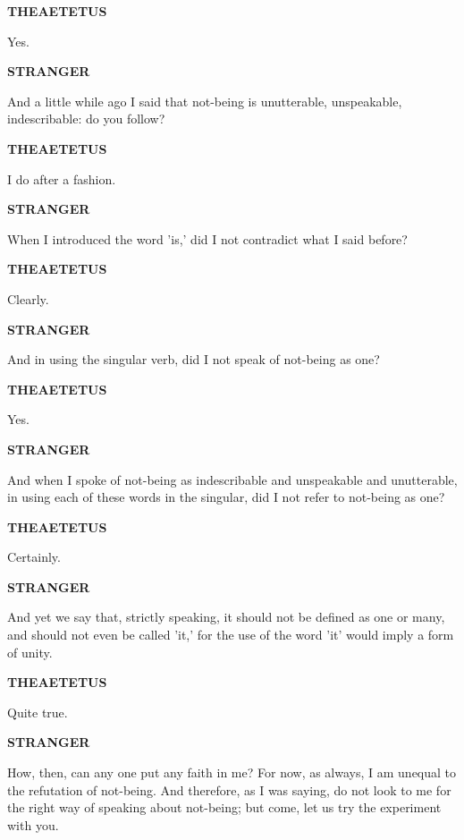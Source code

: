 \documentclass[11pt,letter]{article}
\begin{document}
\par \textbf{THEAETETUS}
\par   Yes.

\par \textbf{STRANGER}
\par   And a little while ago I said that not-being is unutterable, unspeakable, indescribable:  do you follow?

\par \textbf{THEAETETUS}
\par   I do after a fashion.

\par \textbf{STRANGER}
\par   When I introduced the word 'is,' did I not contradict what I said before?

\par \textbf{THEAETETUS}
\par   Clearly.

\par \textbf{STRANGER}
\par   And in using the singular verb, did I not speak of not-being as one?

\par \textbf{THEAETETUS}
\par   Yes.

\par \textbf{STRANGER}
\par   And when I spoke of not-being as indescribable and unspeakable and unutterable, in using each of these words in the singular, did I not refer to not-being as one?

\par \textbf{THEAETETUS}
\par   Certainly.

\par \textbf{STRANGER}
\par   And yet we say that, strictly speaking, it should not be defined as one or many, and should not even be called 'it,' for the use of the word 'it' would imply a form of unity.

\par \textbf{THEAETETUS}
\par   Quite true.

\par \textbf{STRANGER}
\par   How, then, can any one put any faith in me? For now, as always, I am unequal to the refutation of not-being. And therefore, as I was saying, do not look to me for the right way of speaking about not-being; but come, let us try the experiment with you.
\end{document}

